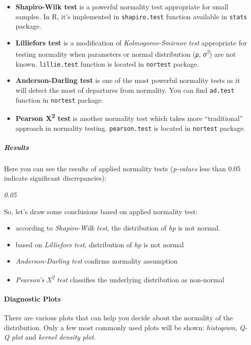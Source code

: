 \documentclass[]{article}
\begin{document}
\begin{itemize}
\item
  \textbf{Shapiro-Wilk test} is a powerful normality test appropriate
  for small samples. In R, it's implemented in \texttt{shapiro.test}
  function available in \texttt{stats} package.
\item
  \textbf{Lilliefors test} is a modification of \emph{Kolmogorov-Smirnov
  test} appropriate for testing normality when parameters or normal
  distribution (\emph{μ}, \emph{σ\textsuperscript{2}}) are not known.
  \texttt{lillie.test} function is located in \texttt{nortest} package.
\item
  \textbf{Anderson-Darling test} is one of the most powerful normality
  tests as it will detect the most of departures from normality. You can
  find \texttt{ad.test} function in \texttt{nortest} package.
\item
  \textbf{Pearson Χ\textsuperscript{2} test} is another normality test
  which takes more ``traditional'' approach in normality testing.
  \texttt{pearson.test} is located in \texttt{nortest} package.
\end{itemize}
\subparagraph{Results}

Here you can see the results of applied normality tests (\emph{p-values}
less than 0.05 indicate significant discrepancies):

\emph{0.05}

So, let's draw some conclusions based on applied normality test:

\begin{itemize}
\item
  according to \emph{Shapiro-Wilk test}, the distribution of \emph{hp}
  is not normal.
\item
  based on \emph{Lilliefors test}, distribution of \emph{hp} is not
  normal
\item
  \emph{Anderson-Darling test} confirms normality assumption
\item
  \emph{Pearson's Χ\textsuperscript{2} test} classifies the underlying
  distribution as non-normal
\end{itemize}
\paragraph{Diagnostic Plots}

There are various plots that can help you decide about the normality of
the distribution. Only a few most commonly used plots will be shown:
\emph{histogram}, \emph{Q-Q plot} and \emph{kernel density plot}.
\end{document}
